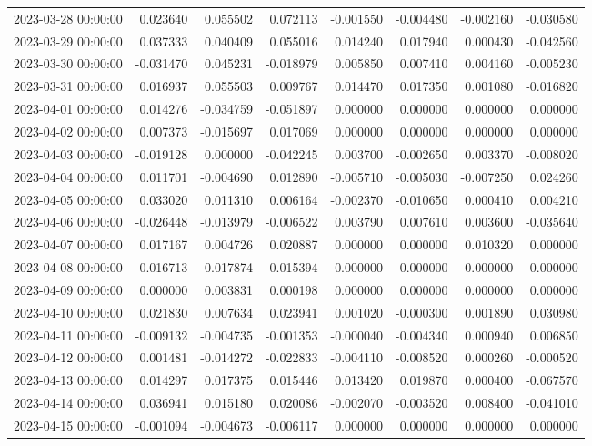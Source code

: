 \begin{tabular}{lrrrrrrr}
2023-03-28 00:00:00 & 0.023640 & 0.055502 & 0.072113 & -0.001550 & -0.004480 & -0.002160 & -0.030580 \\
2023-03-29 00:00:00 & 0.037333 & 0.040409 & 0.055016 & 0.014240 & 0.017940 & 0.000430 & -0.042560 \\
2023-03-30 00:00:00 & -0.031470 & 0.045231 & -0.018979 & 0.005850 & 0.007410 & 0.004160 & -0.005230 \\
2023-03-31 00:00:00 & 0.016937 & 0.055503 & 0.009767 & 0.014470 & 0.017350 & 0.001080 & -0.016820 \\
2023-04-01 00:00:00 & 0.014276 & -0.034759 & -0.051897 & 0.000000 & 0.000000 & 0.000000 & 0.000000 \\
2023-04-02 00:00:00 & 0.007373 & -0.015697 & 0.017069 & 0.000000 & 0.000000 & 0.000000 & 0.000000 \\
2023-04-03 00:00:00 & -0.019128 & 0.000000 & -0.042245 & 0.003700 & -0.002650 & 0.003370 & -0.008020 \\
2023-04-04 00:00:00 & 0.011701 & -0.004690 & 0.012890 & -0.005710 & -0.005030 & -0.007250 & 0.024260 \\
2023-04-05 00:00:00 & 0.033020 & 0.011310 & 0.006164 & -0.002370 & -0.010650 & 0.000410 & 0.004210 \\
2023-04-06 00:00:00 & -0.026448 & -0.013979 & -0.006522 & 0.003790 & 0.007610 & 0.003600 & -0.035640 \\
2023-04-07 00:00:00 & 0.017167 & 0.004726 & 0.020887 & 0.000000 & 0.000000 & 0.010320 & 0.000000 \\
2023-04-08 00:00:00 & -0.016713 & -0.017874 & -0.015394 & 0.000000 & 0.000000 & 0.000000 & 0.000000 \\
2023-04-09 00:00:00 & 0.000000 & 0.003831 & 0.000198 & 0.000000 & 0.000000 & 0.000000 & 0.000000 \\
2023-04-10 00:00:00 & 0.021830 & 0.007634 & 0.023941 & 0.001020 & -0.000300 & 0.001890 & 0.030980 \\
2023-04-11 00:00:00 & -0.009132 & -0.004735 & -0.001353 & -0.000040 & -0.004340 & 0.000940 & 0.006850 \\
2023-04-12 00:00:00 & 0.001481 & -0.014272 & -0.022833 & -0.004110 & -0.008520 & 0.000260 & -0.000520 \\
2023-04-13 00:00:00 & 0.014297 & 0.017375 & 0.015446 & 0.013420 & 0.019870 & 0.000400 & -0.067570 \\
2023-04-14 00:00:00 & 0.036941 & 0.015180 & 0.020086 & -0.002070 & -0.003520 & 0.008400 & -0.041010 \\
2023-04-15 00:00:00 & -0.001094 & -0.004673 & -0.006117 & 0.000000 & 0.000000 & 0.000000 & 0.000000 \\

\end{tabular}
